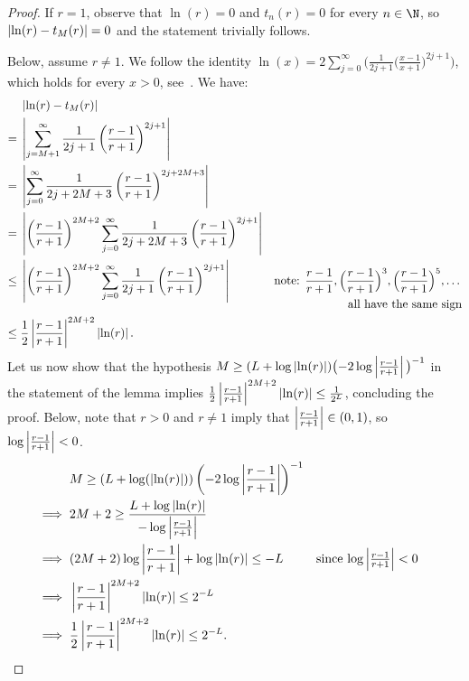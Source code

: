 \begin{proof}
  If $r = 1$, observe that $\ln(r) = 0$ 
  and $t_n(r) = 0$ for every $n \in \N$, 
  so $\left|\ln(r)-t_M(r)\right| = 0$ and the statement trivially follows. 

  Below, assume $r \neq 1$.
  We follow the identity $\ln(x) = 2 \sum_{j=0}^\infty \big(\frac{1}{2j+1} \big(\frac{x-1}{x+1}\big)^{2j+1}\big)$, which holds for every $x > 0$, see~\cite[Equation~4.6.4]{Olver10}.
  We have:
  \begin{equation*}\label{inequality-log-expansion}
    \begin{aligned}
          &\left|\ln(r)-t_M(r)\right|\\
      ={} &\left|\sum_{j=M+1}^\infty\frac{1}{2j+1}
      \left( \frac{r-1}{r+1} \right)^{2j+1}\right|\\
      ={} &\left|\sum_{j=0}^\infty\frac{1}{2j+2M+3}
      \left( \frac{r-1}{r+1} \right)^{2j+2M+3}\right|\\ 
      ={}&\left|\left( \frac{r-1}{r+1} \right)^{2M+2}
      \sum_{j=0}^\infty\frac{1}{2j+2M+3}\left( \frac{r-1}{r+1} \right)^{2j+1}\right|\\
      \leq{}&\left|\left( \frac{r-1}{r+1} \right)^{2M+2}
      \sum_{j=0}^\infty\frac{1}{2j+1}\left( \frac{r-1}{r+1} \right)^{2j+1}\right|
      &\text{note: $\frac{r-1}{r+1}, \Big( \frac{r-1}{r+1} \Big)^{3},\Big( \frac{r-1}{r+1} \Big)^{5},\dots$}\\[-8pt]
      &&\text{all have the same sign}\\ 
      \leq{}&
      \frac{1}{2}\left|\frac{r-1}{r+1}\right|^{2M+2}\left|\ln(r)\right|.
    \end{aligned}
  \end{equation*}
  Let us now show that the hypothesis 
  $M \geq (L+\log\left|\ln(r)\right|) \big({-}2\log\left|\frac{r-1}{r+1}\right|\big)^{-1}$ in the statement of the lemma implies $\frac{1}{2}\left|\frac{r-1}{r+1}\right|^{2M+2}\left|\ln(r)\right| \leq \frac{1}{2^L}$, concluding the proof. Below, note that $r>0$ and $r \neq 1$ imply 
  that $\left|\frac{r-1}{r+1}\right| \in (0,1)$, so $\log\left|\frac{r-1}{r+1}\right| < 0$.
  \begin{align*}
    &M\geq(L+\log(\left|\ln(r)\right|))\left( -2\log\left|\frac{r-1}{r+1}\right| \right)^{-1}\\
    \implies{}&
    2M+2\geq \frac{L+\log\left|\ln(r)\right|}{-\log\left|\frac{r-1}{r+1}\right|}\\
    \implies{}&(2M+2)\log\left|\frac{r-1}{r+1}\right|+\log\left|\ln(r)\right|\leq -L
    &\text{since $\textstyle\log\left|\frac{r-1}{r+1}\right| < 0$}\\
    \implies{}&\left|\frac{r-1}{r+1}\right|^{2M+2}\left|\ln(r)\right|\leq 2^{-L}\\
    \implies{}&\frac{1}{2}\left|\frac{r-1}{r+1}\right|^{2M+2}\left|\ln(r)\right|\leq 2^{-L}.
    &&\qedhere
  \end{align*}
\end{proof}

